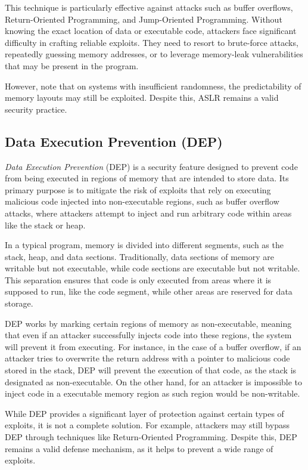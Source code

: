 This technique is particularly effective against attacks such as buffer overflows,
Return-Oriented Programming, and Jump-Oriented Programming. Without knowing the
exact location of data or executable code, attackers face significant difficulty
in crafting reliable exploits. They need to resort to brute-force attacks, repeatedly
guessing memory addresses, or to leverage memory-leak vulnerabilities that may
be present in the program.

However, note that on systems with insufficient randomness, the predictability
of memory layouts may still be exploited. Despite this, ASLR remains a valid
security practice.

\subsection{Data Execution Prevention (DEP)}
\label{subsec:background_dep}

\textit{Data Execution Prevention} (DEP) is a security feature designed to
prevent code from being executed in regions of memory that are intended to store
data. Its primary purpose is to mitigate the risk of exploits that rely on executing
malicious code injected into non-executable regions, such as buffer overflow
attacks, where attackers attempt to inject and run arbitrary code within areas like
the stack or heap.

In a typical program, memory is divided into different segments, such as the stack,
heap, and data sections. Traditionally, data sections of memory are writable but
not executable, while code sections are executable but not writable. This separation
ensures that code is only executed from areas where it is supposed to run, like
the code segment, while other areas are reserved for data storage.

DEP works by marking certain regions of memory as non-executable, meaning that
even if an attacker successfully injects code into these regions, the system will
prevent it from executing. For instance, in the case of a buffer overflow, if an
attacker tries to overwrite the return address with a pointer to malicious code
stored in the stack, DEP will prevent the execution of that code, as the stack
is designated as non-executable. On the other hand, for an attacker is
impossible to inject code in a executable memory region as such region would be
non-writable.

While DEP provides a significant layer of protection against certain types of
exploits, it is not a complete solution. For example, attackers may still bypass
DEP through techniques like Return-Oriented Programming. Despite this, DEP remains
a valid defense mechanism, as it helps to prevent a wide range of exploits.

